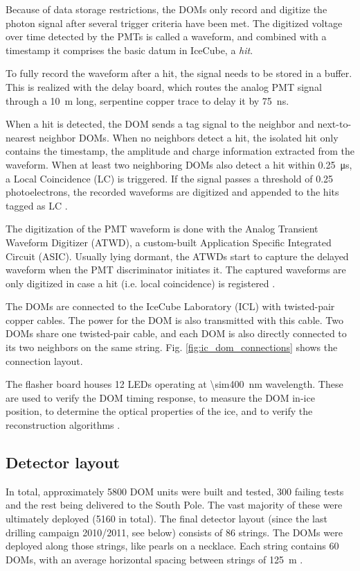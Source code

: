 \documentclass[
    a4paper, %
    fontsize=10pt, %
    twoside=false, %
    numbers=noenddot, %
    fontmethod=tex,
]{kaobook}
\begin{document}
Because of data storage restrictions, the DOMs only record and digitize the photon signal after several trigger criteria have been met. The digitized voltage over time detected by the PMTs is called a waveform, and combined with a timestamp it comprises the basic datum in IceCube, a \textit{hit}.

To fully record the waveform after a hit, the signal needs to be stored in a buffer. This is realized with the delay board, which routes the analog PMT signal through a \SI{10}{\m} long, serpentine copper trace to delay it by \SI{75}{\ns}.

When a hit is detected, the DOM sends a tag signal to the neighbor and next-to-nearest neighbor DOMs. When no neighbors detect a hit, the isolated hit only contains the timestamp, the amplitude and charge information extracted from the waveform. When at least two neighboring DOMs also detect a hit within \SI{0.25}{\micro\s}, a Local Coincidence (LC) is triggered. If the signal passes a threshold of 0.25 photoelectrons, the recorded waveforms are digitized and appended to the hits tagged as LC \cite{Aartsen2017}.

The digitization of the PMT waveform is done with the Analog Transient Waveform Digitizer (ATWD), a custom-built Application Specific Integrated Circuit (ASIC). Usually lying dormant, the ATWDs start to capture the delayed waveform when the PMT discriminator initiates it. The captured waveforms are only digitized in case a hit (i.e. local coincidence) is registered .

The DOMs are connected to the IceCube Laboratory (ICL) with twisted-pair copper cables. The power for the DOM is also transmitted with this cable. Two DOMs share one twisted-pair cable, and each DOM is also directly connected to its two neighbors on the same string. Fig. \ref{fig:ic_dom_connections} shows the connection layout.

The flasher board houses 12 LEDs operating at \SI{\sim400}{\nm} wavelength. These are used to verify the DOM timing response, to measure the DOM in-ice position, to determine the optical properties of the ice, and to verify the reconstruction algorithms \cite{Aartsen2017}.

\subsection{Detector layout}
In total, approximately 5800 DOM units were built and tested, 300 failing tests and the rest being delivered to the South Pole. The vast majority of these were ultimately deployed (5160 in total). The final detector layout (since the last drilling campaign 2010/2011, see below) consists of 86 strings. The DOMs were deployed along those strings, like pearls on a necklace. Each string contains 60 DOMs, with an average horizontal spacing between strings of \SI{125}{\meter} \cite{Aartsen2017}.
\end{document}
